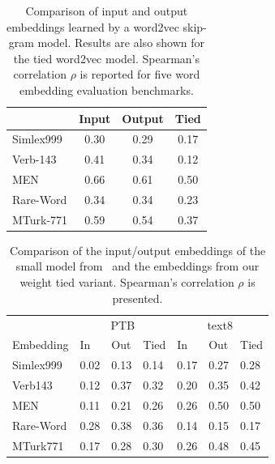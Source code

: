 \documentclass[11pt]{article}
\begin{document}
\begin{table}[t]

\begin{small}
\begin{center}
\begin{tabular}{l|cc|c}
\hline
                                        & Input & Output  & Tied \\ \hline
Simlex999        & 0.30           & 0.29    &    0.17      \\ 
Verb-143          & 0.41            & 0.34    &     0.12    \\ 
MEN            & 0.66           & 0.61     &    0.50     \\ 
Rare-Word     & 0.34          & 0.34     &    0.23    \\ 
MTurk-771       & 0.59            & 0.54    &    0.37     \\
\hline

\end{tabular}
\end{center}
\end{small}
\caption{\small  Comparison of input and output embeddings learned by a word2vec skip-gram model. Results are also shown for the tied word2vec model. Spearman's correlation $\rho$  is reported for five word embedding evaluation benchmarks.}
\label{tab:w2v-table}
%
\end{table}




\begin{table}[t]
%

%

\begin{center}
\begin{small}
\begin{tabular}{l|ll|l||ll|l}

\hline
   &   \multicolumn{3}{c||}{PTB}  &        \multicolumn{3}{c}{text8}     \\ %
Embedding & In   & Out  & Tied & In   & Out  & Tied \\ \hline
Simlex999 & 0.02 & 0.13 & 0.14 & 0.17 & 0.27 & 0.28     \\ \hline
Verb143   & 0.12 & 0.37 & 0.32 & 0.20 & 0.35 & 0.42 \\ \hline
MEN       & 0.11 & 0.21 & 0.26 & 0.26 & 0.50 & 0.50    \\ \hline
Rare-Word & 0.28 & 0.38 & 0.36 & 0.14 & 0.15 & 0.17 \\ \hline
MTurk771  & 0.17 & 0.28 & 0.30 & 0.26 & 0.48 & 0.45 \\ \hline
\end{tabular}
\end{small}
\end{center}
\caption {\small Comparison of the input/output embeddings of the small model from~\protect\cite{zaremba14} and the embeddings from our weight tied variant. Spearman's correlation $\rho$ is presented.}
%
\label{tab:lm-embeddings-table}

\end{table}
\end{document}
